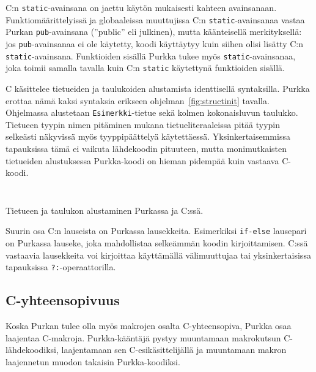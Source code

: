 C:n \texttt{static}-avainsana on jaettu käytön mukaisesti kahteen avainsanaan.
Funktiomäärittelyissä ja globaaleissa muuttujissa C:n
\texttt{static}-avainsanaa vastaa Purkan \texttt{pub}-avainsana (''public'' eli
julkinen), mutta käänteisellä merkityksellä: jos \texttt{pub}-avainsanaa ei ole
käytetty, koodi käyttäytyy kuin siihen olisi lisätty C:n
\texttt{static}-avainsana. Funktioiden sisällä Purkka tukee myös
\texttt{static}-avainsanaa, joka toimii samalla tavalla kuin C:n
\texttt{static} käytettynä funktioiden sisällä.

C käsittelee tietueiden ja taulukoiden alustamista identtisellä syntaksilla.
Purkka erottaa nämä kaksi syntaksia erikseen ohjelman~\ref{fig:structinit}
tavalla. Ohjelmassa alustetaan \texttt{Esimerkki}-tietue sekä kolmen
kokonaisluvun taulukko. Tietueen tyypin nimen pitäminen mukana
tietueliteraaleissa pitää tyypin selkeästi näkyvissä myös tyyppipäättelyä
käytettäessä. Yksinkertaisemmissa tapauksissa tämä ei vaikuta lähdekoodin
pituuteen, mutta monimutkaisten tietueiden alustuksessa Purkka-koodi on hieman
pidempää kuin vastaava C-koodi.

\begin{listing}[ht!]
    \inputminted{Rust}{koodi/structinit.prk}
    \inputminted{C}{koodi/structinit.c}
    \caption{Tietueen ja taulukon alustaminen Purkassa ja C:ssä.}
    \label{fig:structinit}
\end{listing}

Suurin osa C:n lauseista on Purkassa lausekkeita. Esimerkiksi \texttt{if-else}
lausepari on Purkassa lauseke, joka mahdollistaa selkeämmän koodin
kirjoittamisen. C:ssä vastaavia lausekkeita voi kirjoittaa käyttämällä
välimuuttujaa tai yksinkertaisissa tapauksissa \texttt{?:}-operaattorilla.

\subsection{C-yhteensopivuus}

Koska Purkan tulee olla myös makrojen osalta C-yhteensopiva, Purkka osaa
laajentaa C-makroja. Purkka-kääntäjä pystyy muuntamaan makrokutsun
C-lähdekoodiksi, laajentamaan sen C-esikäsittelijällä ja muuntamaan makron
laajennetun muodon takaisin Purkka-koodiksi.


